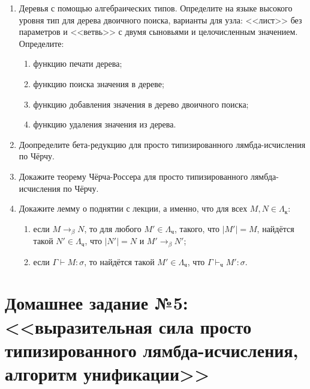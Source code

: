 \documentclass[10pt,a4paper,oneside]{article}
\begin{document}
\begin{enumerate}
\item Деревья с помощью алгебраических типов.
  Определите на языке высокого уровня тип для дерева двоичного поиска, 
  варианты для узла: <<лист>> без параметров и <<ветвь>> с двумя сыновьями и целочисленным значением.
  Определите:
  \begin{enumerate}
    \item функцию печати дерева;
    \item функцию поиска значения в дереве;
    \item функцию добавления значения в дерево двоичного поиска;
    \item функцию удаления значения из дерева.
  \end{enumerate}

\item Доопределите бета-редукцию для просто типизированного лямбда-исчисления по Чёрчу.

\item Докажите теорему Чёрча-Россера для просто типизированного лямбда-исчисления по Чёрчу.

\item Докажите лемму о поднятии с лекции, а именно, что для всех $M,N \in \Lambda_{\texttt{к}}$:
  \begin{enumerate}
  \item если $M \rightarrow_\beta N$, то для любого $M' \in \Lambda_{\texttt{ч}}$, такого, что
        $|M'| = M$, найдётся такой $N' \in \Lambda_{\texttt{ч}}$, что $|N'| = N$ и $M' \rightarrow_\beta N'$;
  \item если $\Gamma \vdash M : \sigma$, то найдётся такой $M' \in \Lambda_{\texttt{ч}}$, что $\Gamma \vdash_\texttt{ч} M': \sigma$.
  \end{enumerate} 

\end{enumerate}

\section*{Домашнее задание №5: <<выразительная сила просто типизированного лямбда-исчисления, алгоритм унификации>>}
\end{document}
